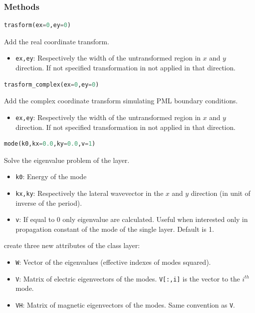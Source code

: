 \documentclass[a4paper,10pt]{report}
\begin{document}
\subsubsection{Methods}
\begin{lstlisting}[language=Python,basicstyle=\ttfamily\Large]
trasform(ex=0,ey=0)
\end{lstlisting}
Add the real coordinate transform.
\begin{itemize}[noitemsep,topsep=0pt,parsep=0pt,partopsep=0pt]
\item \texttt{ex,ey}: Respectively the width of the untransformed region in $x$ and $y$ direction. If not specified transformation in not applied in that direction.
\end{itemize}

\begin{lstlisting}[language=Python,basicstyle=\ttfamily\Large]
trasform_complex(ex=0,ey=0)
\end{lstlisting}
Add the complex coordinate transform simulating PML boundary conditions. 
\begin{itemize}[noitemsep,topsep=0pt,parsep=0pt,partopsep=0pt]
\item \texttt{ex,ey}: Respectively the width of the untransformed region in $x$ and $y$ direction. If not specified transformation in not applied in that direction.
\end{itemize}

\begin{lstlisting}[language=Python,basicstyle=\ttfamily\Large]
mode(k0,kx=0.0,ky=0.0,v=1)
\end{lstlisting}
Solve the eigenvalue problem of the layer.
\begin{itemize}[noitemsep,topsep=0pt,parsep=0pt,partopsep=0pt]
\item \texttt{k0}: Energy of the mode
\item \texttt{kx,ky}: Respectively the lateral wavevector in the $x$ and $y$ direction (in unit of inverse of the period).
\item  \texttt{v}: If equal to 0 only eigenvalue are calculated. Useful when interested only in propagation constant of the mode of the single layer. Default is 1.
\end{itemize}
create three new attributes of the class layer:
\begin{itemize}[noitemsep,topsep=0pt,parsep=0pt,partopsep=0pt]
\item \texttt{W}: Vector of the eigenvalues (effective indexes of modes squared). 
\item \texttt{V}: Matrix of electric eigenvectors of the modes. \texttt{V[:,i]} is the vector to the $i^{th}$ mode.
\item \texttt{VH}: Matrix of magnetic eigenvectors of the modes. Same convention as \texttt{V}.
\end{itemize}
\end{document}
